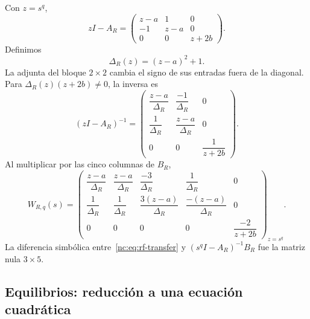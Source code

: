 Con \(z=s^q\),
\begin{equation}
 zI-A_R=
 \begin{pmatrix}
 z-a&1&0\\-1&z-a&0\\0&0&z+2b
 \end{pmatrix}.
\end{equation}
Definimos
\begin{equation}
 \Delta_R(z)=(z-a)^2+1.
 \label{nc:eq:rf-delta}
\end{equation}
La adjunta del bloque \(2\times2\) cambia el signo de sus entradas fuera
de la diagonal. Para \(\Delta_R(z)(z+2b)\ne0\), la inversa es
\begin{equation}
 (zI-A_R)^{-1}=
 \begin{pmatrix}
 \dfrac{z-a}{\Delta_R}&\dfrac{-1}{\Delta_R}&0\\[7pt]
 \dfrac{1}{\Delta_R}&\dfrac{z-a}{\Delta_R}&0\\[7pt]
 0&0&\dfrac{1}{z+2b}
 \end{pmatrix}.
\end{equation}
Al multiplicar por las cinco columnas de \(B_R\),
\begin{equation}
 W_{R,q}(s)=
 \begin{pmatrix}
 \dfrac{z-a}{\Delta_R}&
 \dfrac{z-a}{\Delta_R}&
 \dfrac{-3}{\Delta_R}&
 \dfrac{1}{\Delta_R}&0\\[8pt]
 \dfrac{1}{\Delta_R}&
 \dfrac{1}{\Delta_R}&
 \dfrac{3(z-a)}{\Delta_R}&
 \dfrac{-(z-a)}{\Delta_R}&0\\[8pt]
 0&0&0&0&\dfrac{-2}{z+2b}
 \end{pmatrix}_{z=s^q}.
 \label{nc:eq:rf-transfer}
\end{equation}
La diferencia simbólica entre~\eqref{nc:eq:rf-transfer} y
\((s^qI-A_R)^{-1}B_R\) fue la matriz nula \(3\times5\).

\subsection{Equilibrios: reducción a una ecuación cuadrática}

